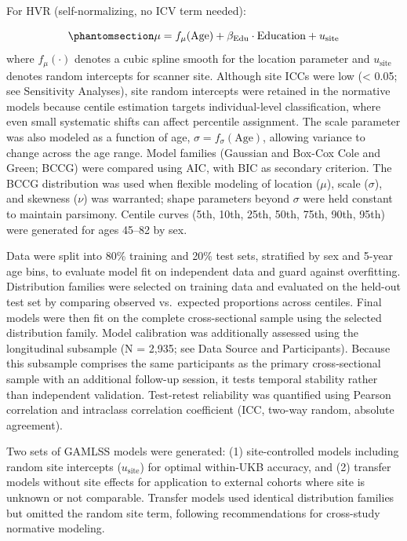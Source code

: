 \documentclass[
]{article}
\begin{document}
For HVR (self-normalizing, no ICV term needed):

\begin{equation}\phantomsection\label{eq-gamlss-hvr}{\mu = f_\mu(\text{Age}) + \beta_{\text{Edu}} \cdot \text{Education} + u_{\text{site}}}\end{equation}
where \(f_\mu(\cdot)\) denotes a cubic spline smooth for the location
parameter and \(u_{\text{site}}\) denotes random intercepts for scanner
site. Although site ICCs were low (\textless{} 0.05; see Sensitivity
Analyses), site random intercepts were retained in the normative models
because centile estimation targets individual-level classification,
where even small systematic shifts can affect percentile assignment. The
scale parameter was also modeled as a function of age,
\(\sigma = f_\sigma(\text{Age})\), allowing variance to change across
the age range. Model families (Gaussian and Box-Cox Cole and Green;
BCCG) were compared using AIC, with BIC as secondary criterion. The BCCG
distribution was used when flexible modeling of location (\(\mu\)),
scale (\(\sigma\)), and skewness (\(\nu\)) was warranted; shape
parameters beyond \(\sigma\) were held constant to maintain parsimony.
Centile curves (5th, 10th, 25th, 50th, 75th, 90th, 95th) were generated
for ages 45--82 by sex.

Data were split into 80\% training and 20\% test sets, stratified by sex
and 5-year age bins, to evaluate model fit on independent data and guard
against overfitting. Distribution families were selected on training
data and evaluated on the held-out test set by comparing observed
vs.~expected proportions across centiles. Final models were then fit on
the complete cross-sectional sample using the selected distribution
family. Model calibration was additionally assessed using the
longitudinal subsample (N = 2,935; see Data Source and Participants).
Because this subsample comprises the same participants as the primary
cross-sectional sample with an additional follow-up session, it tests
temporal stability rather than independent validation. Test-retest
reliability was quantified using Pearson correlation and intraclass
correlation coefficient (ICC, two-way random, absolute agreement).

Two sets of GAMLSS models were generated: (1) site-controlled models
including random site intercepts (\(u_{\text{site}}\)) for optimal
within-UKB accuracy, and (2) transfer models without site effects for
application to external cohorts where site is unknown or not comparable.
Transfer models used identical distribution families but omitted the
random site term, following recommendations for cross-study normative
modeling.
\end{document}
